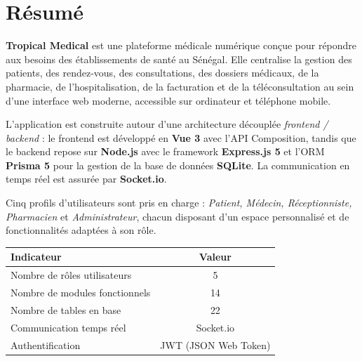 \documentclass[12pt, a4paper]{report}
\begin{document}
\tableofcontents
\clearpage

\chapter*{Résumé}

\textbf{Tropical Medical} est une plateforme médicale numérique conçue pour
répondre aux besoins des établissements de santé au Sénégal. Elle centralise
la gestion des patients, des rendez-vous, des consultations, des dossiers
médicaux, de la pharmacie, de l'hospitalisation, de la facturation et de la
téléconsultation au sein d'une interface web moderne, accessible sur ordinateur
et téléphone mobile.

\medskip

L'application est construite autour d'une architecture découplée
\textit{frontend / backend} : le frontend est développé en \textbf{Vue 3} avec
l'API Composition, tandis que le backend repose sur \textbf{Node.js} avec le
framework \textbf{Express.js 5} et l'ORM \textbf{Prisma 5} pour la gestion
de la base de données \textbf{SQLite}. La communication en temps réel est
assurée par \textbf{Socket.io}.

\medskip

Cinq profils d'utilisateurs sont pris en charge : \textit{Patient, Médecin,
Réceptionniste, Pharmacien} et \textit{Administrateur}, chacun disposant d'un
espace personnalisé et de fonctionnalités adaptées à son rôle.

\bigskip

\begin{center}
\begin{tabular}{lc}
  \toprule
  \textbf{Indicateur} & \textbf{Valeur} \\
  \midrule
  Nombre de rôles utilisateurs   & 5 \\
  Nombre de modules fonctionnels & 14 \\
  Nombre de tables en base       & 22 \\
  Communication temps réel       & Socket.io \\
  Authentification               & JWT (JSON Web Token) \\
  \bottomrule
\end{tabular}
\end{center}

\end{document}
